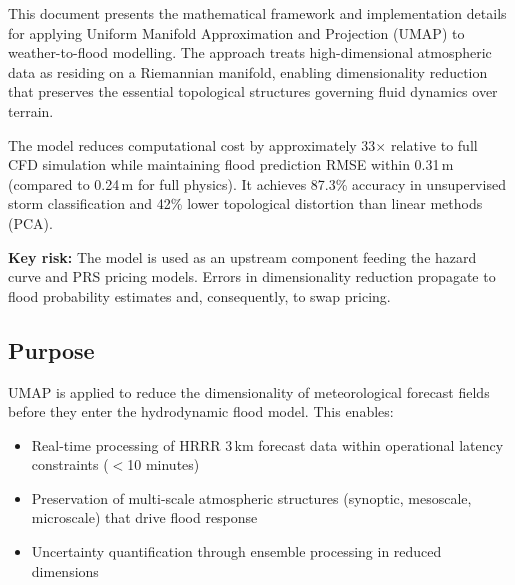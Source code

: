 \documentclass{article}
\begin{document}
\mkmtitlepage
{}
\tableofcontents
\clearpage
\mkmlegalpage



\mkmexecsummary

This document presents the mathematical framework and implementation details for applying
Uniform Manifold Approximation and Projection (UMAP) to weather-to-flood modelling. The
approach treats high-dimensional atmospheric data as residing on a Riemannian manifold,
enabling dimensionality reduction that preserves the essential topological structures
governing fluid dynamics over terrain.

The model reduces computational cost by approximately 33$\times$ relative to full CFD
simulation while maintaining flood prediction RMSE within 0.31\,m (compared to 0.24\,m
for full physics). It achieves 87.3\% accuracy in unsupervised storm classification and
42\% lower topological distortion than linear methods (PCA).

\textbf{Key risk:} The model is used as an upstream component feeding the hazard curve
and PRS pricing models. Errors in dimensionality reduction propagate to flood probability
estimates and, consequently, to swap pricing.

\mkmpurpose

\subsection{Purpose}
UMAP is applied to reduce the dimensionality of meteorological forecast fields before
they enter the hydrodynamic flood model. This enables:
\begin{itemize}[nosep]
    \item Real-time processing of HRRR 3\,km forecast data within operational latency
          constraints ($<$10 minutes)
    \item Preservation of multi-scale atmospheric structures (synoptic, mesoscale,
          microscale) that drive flood response
    \item Uncertainty quantification through ensemble processing in reduced dimensions
\end{itemize}
\end{document}
